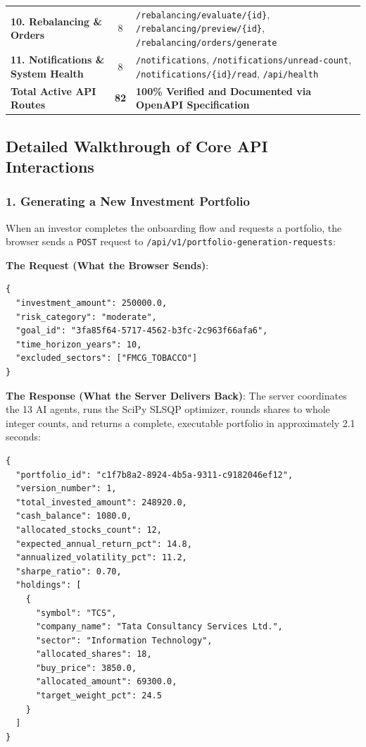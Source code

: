 \begin{table}[H]
{\begin{tabular}{lcl}
\textbf{10. Rebalancing \& Orders} & 8 & \texttt{/rebalancing/evaluate/\{id\}}, \texttt{/rebalancing/preview/\{id\}}, \texttt{/rebalancing/orders/generate} \\
\textbf{11. Notifications \& System Health} & 8 & \texttt{/notifications}, \texttt{/notifications/unread-count}, \texttt{/notifications/\{id\}/read}, \texttt{/api/health} \\
\bottomrule
\textbf{Total Active API Routes} & \textbf{82} & \textbf{100\% Verified and Documented via OpenAPI Specification} \\
\bottomrule
\end{tabular}%
}
\end{table}

\subsection{Detailed Walkthrough of Core API Interactions}

\subsubsection{1. Generating a New Investment Portfolio}
When an investor completes the onboarding flow and requests a portfolio, the browser sends a \texttt{POST} request to \texttt{/api/v1/portfolio-generation-requests}:

\noindent \textbf{The Request (What the Browser Sends)}:
\begin{footnotesize}
\begin{verbatim}
{
  "investment_amount": 250000.0,
  "risk_category": "moderate",
  "goal_id": "3fa85f64-5717-4562-b3fc-2c963f66afa6",
  "time_horizon_years": 10,
  "excluded_sectors": ["FMCG_TOBACCO"]
}
\end{verbatim}
\end{footnotesize}

\noindent \textbf{The Response (What the Server Delivers Back)}:
The server coordinates the 13 AI agents, runs the SciPy SLSQP optimizer, rounds shares to whole integer counts, and returns a complete, executable portfolio in approximately 2.1 seconds:
\begin{footnotesize}
\begin{verbatim}
{
  "portfolio_id": "c1f7b8a2-8924-4b5a-9311-c9182046ef12",
  "version_number": 1,
  "total_invested_amount": 248920.0,
  "cash_balance": 1080.0,
  "allocated_stocks_count": 12,
  "expected_annual_return_pct": 14.8,
  "annualized_volatility_pct": 11.2,
  "sharpe_ratio": 0.70,
  "holdings": [
    {
      "symbol": "TCS",
      "company_name": "Tata Consultancy Services Ltd.",
      "sector": "Information Technology",
      "allocated_shares": 18,
      "buy_price": 3850.0,
      "allocated_amount": 69300.0,
      "target_weight_pct": 24.5
    }
  ]
}
\end{verbatim}
\end{footnotesize}

